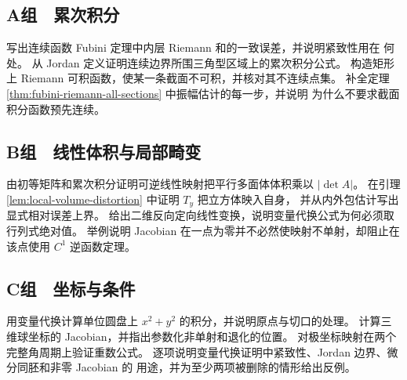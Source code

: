 \subsection*{A组　累次积分}
\begin{enumerate}[label=\textbf{\thechapter.\arabic*.}]
 写出连续函数 Fubini 定理中内层 Riemann 和的一致误差，并说明紧致性用在
 何处。
 从 Jordan 定义证明连续边界所围三角型区域上的累次积分公式。
 构造矩形上 Riemann 可积函数，使某一条截面不可积，并核对其不连续点集。
 补全定理 \ref{thm:fubini-riemann-all-sections} 中振幅估计的每一步，并说明
 为什么不要求截面积分函数预先连续。
\end{enumerate}

\subsection*{B组　线性体积与局部畸变}
\begin{enumerate}[label=\textbf{\thechapter.\arabic*.},resume]
 由初等矩阵和累次积分证明可逆线性映射把平行多面体体积乘以
 \( |\det A| \)。
 在引理 \ref{lem:local-volume-distortion} 中证明 \(T_y\) 把立方体映入自身，
 并从内外包估计写出显式相对误差上界。
 给出二维反向定向线性变换，说明变量代换公式为何必须取行列式绝对值。
 举例说明 Jacobian 在一点为零并不必然使映射不单射，却阻止在该点使用
 \(C^1\) 逆函数定理。
\end{enumerate}

\subsection*{C组　坐标与条件}
\begin{enumerate}[label=\textbf{\thechapter.\arabic*.},resume]
 用变量代换计算单位圆盘上 \(x^2+y^2\) 的积分，并说明原点与切口的处理。
 计算三维球坐标的 Jacobian，并指出参数化非单射和退化的位置。
 对极坐标映射在两个完整角周期上验证重数公式。
 逐项说明变量代换证明中紧致性、Jordan 边界、微分同胚和非零 Jacobian 的
 用途，并为至少两项被删除的情形给出反例。
\end{enumerate}
